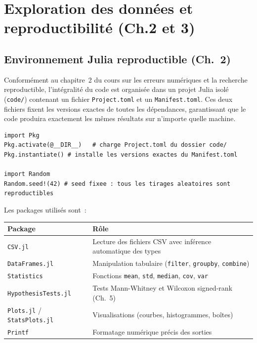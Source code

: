 \documentclass[a4paper,12pt,french]{article}
\newcommand{\code}[1]{\texttt{#1}}
\begin{document}
\newpage
\section{Exploration des données et reproductibilité (Ch.2 et 3)}

\subsection{Environnement Julia reproductible (Ch.~2)}

Conformément au chapitre~2 du cours sur les erreurs numériques et la recherche
reproductible, l'intégralité du code est organisée dans un projet Julia isolé
(\code{code/}) contenant un fichier \code{Project.toml} et un \code{Manifest.toml}.
Ces deux fichiers fixent les versions exactes de toutes les dépendances, garantissant
que le code produira exactement les mêmes résultats sur n'importe quelle machine.

\begin{lstlisting}[caption={Activation de l'environnement et fixation de la graine aléatoire}]
import Pkg
Pkg.activate(@__DIR__)   # charge Project.toml du dossier code/
Pkg.instantiate() # installe les versions exactes du Manifest.toml

import Random
Random.seed!(42) # seed fixee : tous les tirages aleatoires sont reproductibles
\end{lstlisting}

Les packages utilisés sont~:

\begin{center}
\begin{tabular}{L{4cm} L{8.5cm}}
\toprule
\textbf{Package} & \textbf{Rôle} \\
\midrule
\code{CSV.jl} & Lecture des fichiers CSV avec inférence automatique des types \\
\code{DataFrames.jl} & Manipulation tabulaire (\code{filter}, \code{groupby}, \code{combine}) \\
\code{Statistics} & Fonctions \code{mean}, \code{std}, \code{median}, \code{cov}, \code{var} \\
\code{HypothesisTests.jl} & Tests Mann-Whitney et Wilcoxon signed-rank (Ch.~5) \\
\code{Plots.jl} / \code{StatsPlots.jl} & Visualisations (courbes, histogrammes, boîtes) \\
\code{Printf} & Formatage numérique précis des sorties \\
\bottomrule
\end{tabular}
\end{center}
\end{document}
